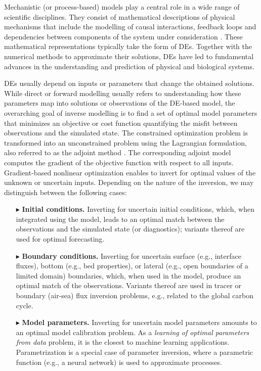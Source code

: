 Mechanistic (or process-based) models play a central role in a wide range of scientific disciplines. 
They consist of mathematical descriptions of physical mechanisms that include the modelling of causal interactions, feedback loops and dependencies between components of the system under consideration \cite{rackauckas2020universal}. 
These mathematical representations typically take the form of DEs. 
Together with the numerical methods to approximate their solutions, DEs have led to fundamental advances in the understanding and prediction of physical and biological systems.

DEs usually depend on inputs or parameters that change the obtained solutions. 
While direct or forward modelling usually refers to understanding how these parameters map into solutions or observations of the DE-based model, 
the overarching goal of inverse modelling is to find a set of optimal model parameters that minimizes an objective or cost function quantifying the misfit between observations and the simulated state.
The constrained optimization problem is transformed into an unconstrained problem using the Lagrangian formulation, also referred to as the adjoint method \cite{Vadlamani.2020, Givoli_2021}. 
The corresponding adjoint model computes the gradient of the objective function with respect to all inputs. 
Gradient-based nonlinear optimization enables to invert for optimal values of the unknown or uncertain inputs.
Depending on the nature of the inversion, we may distinguish between the following cases:
\begin{itemize}
    \item[$\blacktriangleright$] \textbf{Initial conditions.} Inverting for uncertain initial conditions, which, when integrated using the model, leads to an optimal match between the observations and the simulated state (or diagnostics); variants thereof are used for optimal forecasting.
    \item[$\blacktriangleright$] \textbf{Boundary conditions.} Inverting for uncertain surface (e.g., interface fluxes), bottom (e.g., bed properties), or lateral (e.g., open boundaries of a limited domain) boundaries, which, when used in the model, produce an optimal match of the observations. Variants thereof are used in tracer or boundary (air-sea) flux inversion problems, e.g., related to the global carbon cycle.
    \item[$\blacktriangleright$] \textbf{Model parameters.} Inverting for uncertain model parameters amounts to an optimal model calibration problem. As a \textit{learning of optimal parameters from data} problem, it is the closest to machine learning applications. Parametrization is a special case of parameter inversion, where a parametric function (e.g., a neural network) is used to approximate processes. 
\end{itemize}
